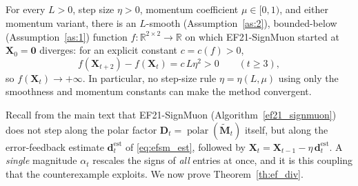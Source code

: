 \providecommand{\smat}[4]{\bigl(\begin{smallmatrix}#1&#2\\#3&#4\end{smallmatrix}\bigr)}

\subsection{}\label{app:proof_th4}

\setcounter{theorem}{3}
\begin{theorem}
For every $L>0$, step size $\eta>0$, momentum coefficient $\mu\in[0,1)$, and
either momentum variant, there is an $L$-smooth (Assumption~\ref{as:2}),
bounded-below (Assumption~\ref{as:1}) function
$f:\mathbb{R}^{2\times2}\!\to\mathbb{R}$ on which EF21-SignMuon started at
$\mathbf{X}_0=\mathbf{0}$ diverges: for an explicit constant $c=c(f)>0$,
\begin{equation}\label{eq:exact_rate_app}
f(\mathbf{X}_{t+2})-f(\mathbf{X}_t)=c\,L\eta^2>0\qquad(t\ge3),
\end{equation}
so $f(\mathbf{X}_t)\to+\infty$. In particular, no step-size rule
$\eta=\eta(L,\mu)$ using only the smoothness and momentum constants can make
the method convergent.
\end{theorem}

Recall from the main text that EF21-SignMuon (Algorithm~\ref{ef21_signmuon})
does not step along the polar factor
$\mathbf D_t=\operatorname{polar}(\tilde{\mathbf M}_t)$ itself, but along the
error-feedback estimate $\mathbf d_t^{\mathrm{est}}$ of \eqref{eq:efsm_est},
followed by $\mathbf X_t=\mathbf X_{t-1}-\eta\,\mathbf d_t^{\mathrm{est}}$. A
\emph{single} magnitude $\alpha_t$ rescales the signs of \emph{all} entries at
once, and it is this coupling that the counterexample exploits. We now prove
Theorem~\ref{th:ef_div}.

